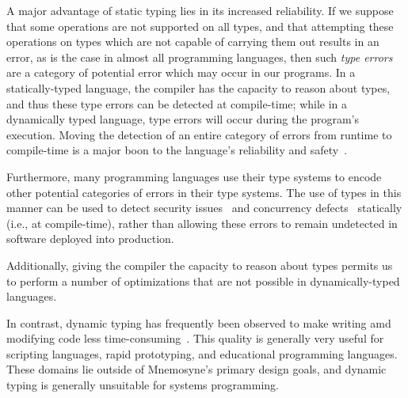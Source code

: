 A major advantage of static typing lies in its increased reliability. If we suppose that some operations are not supported on all types, and that attempting these operations on types which are not capable of carrying them out results in an error, as is the case in almost all programming languages, then such \textit{type errors} are a category of potential error which may occur in our programs. In a statically-typed language, the compiler has the capacity to reason about types, and thus these type errors can be detected at compile-time; while in a dynamically typed language, type errors will occur during the program's execution. Moving the detection of an entire category of errors from runtime to compile-time is a major boon to the language's reliability and safety~\cite{Mitchell:2003:TT:1074100.1074885,Mayer:2012:ESI:2398857.2384666}.

Furthermore, many programming languages use their type systems to encode other potential categories of errors in their type systems. The use of types in this manner can be used to detect security issues~\cite{Skalka:2000:SES:357766.351244} and concurrency defects~\cite{Sagonas:2010:USA:2175429.2175432} statically (i.e., at compile-time), rather than allowing these errors to remain undetected in software deployed into production.

Additionally, giving the compiler the capacity to reason about types permits us to perform a number of optimizations that are not possible in dynamically-typed languages.

In contrast, dynamic typing has frequently been observed to make writing amd modifying code less time-consuming~\cite{Mayer:2012:ESI:2398857.2384666,}. This quality is generally very useful for scripting languages, rapid prototyping, and educational programming languages. These domains lie outside of Mnemosyne's primary design goals, and dynamic typing is generally unsuitable for systems programming.

